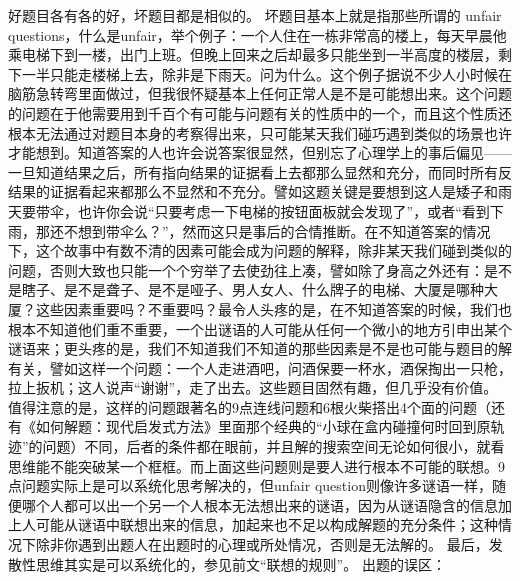 \documentclass[11pt]{article}
\begin{document}
\begin{itemize}
好题目各有各的好，坏题目都是相似的。
坏题目基本上就是指那些所谓的 unfair questions，什么是unfair，举个例子：一个人住在一栋非常高的楼上，每天早晨他乘电梯下到一楼，出门上班。但晚上回来之后却最多只能坐到一半高度的楼层，剩下一半只能走楼梯上去，除非是下雨天。问为什么。这个例子据说不少人小时候在脑筋急转弯里面做过，但我很怀疑基本上任何正常人是不是可能想出来。这个问题的问题在于他需要用到千百个有可能与问题有关的性质中的一个，而且这个性质还根本无法通过对题目本身的考察得出来，只可能某天我们碰巧遇到类似的场景也许才能想到。知道答案的人也许会说答案很显然，但别忘了心理学上的事后偏见——一旦知道结果之后，所有指向结果的证据看上去都那么显然和充分，而同时所有反结果的证据看起来都那么不显然和不充分。譬如这题关键是要想到这人是矮子和雨天要带伞，也许你会说“只要考虑一下电梯的按钮面板就会发现了”，或者“看到下雨，那还不想到带伞么？”，然而这只是事后的合情推断。在不知道答案的情况下，这个故事中有数不清的因素可能会成为问题的解释，除非某天我们碰到类似的问题，否则大致也只能一个个穷举了去使劲往上凑，譬如除了身高之外还有：是不是瞎子、是不是聋子、是不是哑子、男人女人、什么牌子的电梯、大厦是哪种大厦？这些因素重要吗？不重要吗？最令人头疼的是，在不知道答案的时候，我们也根本不知道他们重不重要，一个出谜语的人可能从任何一个微小的地方引申出某个谜语来；更头疼的是，我们不知道我们不知道的那些因素是不是也可能与题目的解有关，譬如这样一个问题：一个人走进酒吧，问酒保要一杯水，酒保掏出一只枪，拉上扳机；这人说声“谢谢”，走了出去。这些题目固然有趣，但几乎没有价值。
值得注意的是，这样的问题跟著名的9点连线问题和6根火柴搭出4个面的问题（还有《如何解题：现代启发式方法》里面那个经典的“小球在盒内碰撞何时回到原轨迹”的问题）不同，后者的条件都在眼前，并且解的搜索空间无论如何很小，就看思维能不能突破某一个框框。而上面这些问题则是要人进行根本不可能的联想。9点问题实际上是可以系统化思考解决的，但unfair question则像许多谜语一样，随便哪个人都可以出一个另一个人根本无法想出来的谜语，因为从谜语隐含的信息加上人可能从谜语中联想出来的信息，加起来也不足以构成解题的充分条件；这种情况下除非你遇到出题人在出题时的心理或所处情况，否则是无法解的。
最后，发散性思维其实是可以系统化的，参见前文“联想的规则”。
出题的误区：


\end{itemize}
\end{document}
